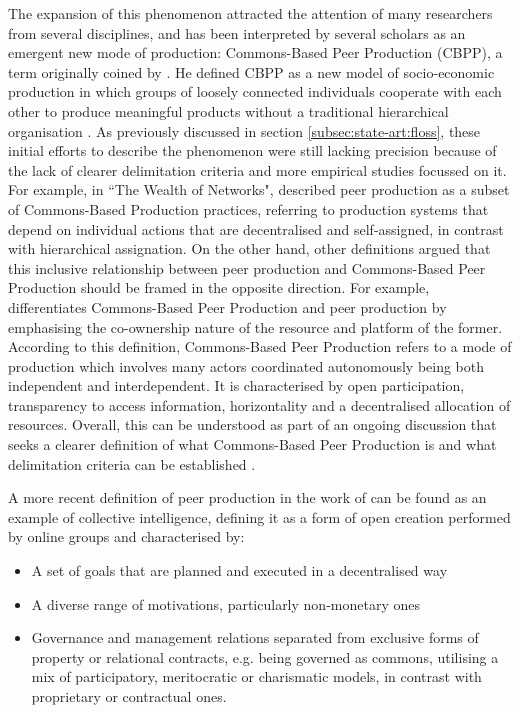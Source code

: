 The expansion of this phenomenon attracted the attention of many researchers from several disciplines, and has been interpreted by several scholars as an emergent new mode of production: Commons-Based Peer Production (CBPP), a term originally coined by \textcite{Benkler2002}. He defined CBPP as a new model of socio-economic production in which groups of loosely connected individuals cooperate with each other to produce meaningful products without a traditional hierarchical organisation \parencite{benkler2006wealth}. As previously discussed in section \ref{subsec:state-art:floss}, these initial efforts to describe the phenomenon were still lacking precision because of the lack of clearer delimitation criteria and more empirical studies focussed on it. For example, in ``The Wealth of Networks",  \textcite{benkler2006wealth} described peer production as a subset of Commons-Based Production practices, referring to production systems that depend on individual actions that are decentralised and self-assigned, in contrast with hierarchical assignation. On the other hand, other definitions argued that this inclusive relationship between peer production and Commons-Based Peer Production should be framed in the opposite direction. For example, \textcite{cbpp-definition-open-value-network:Online} differentiates Commons-Based Peer Production and peer production by emphasising the co-ownership nature of the resource and platform of the former. According to this definition, Commons-Based Peer Production refers to a mode of production which involves many actors coordinated autonomously being both independent and interdependent. It is characterised by open participation, transparency to access information, horizontality and a decentralised allocation of resources. Overall, this can be understood as part of an ongoing discussion that seeks a clearer definition of what Commons-Based Peer Production is and what delimitation criteria can be established \parencite{cbpp-definition-p2pfoundation:Online}.

A more recent definition of peer production in the work of \textcite[2-3]{BenklerAaron2013} can be found as an example of collective intelligence, defining it as a form of open creation performed by online groups and characterised by:

\begin{itemize}
	\item A set of goals that are planned and executed in a decentralised way
	\item A diverse range of motivations, particularly non-monetary ones
	\item Governance and management relations separated from exclusive forms of property or relational contracts, e.g. being governed as commons, utilising a mix of participatory, meritocratic or charismatic models, in contrast with proprietary or contractual ones.
\end{itemize}

